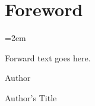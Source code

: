 \pagestyle{myheadings}
\thispagestyle{plain}
\section*{\Large\bfseries Foreword}
\bigskip
\parindent=2em

\noindent
Forward text goes here.

\bigskip

\noindent
Author

\noindent Author's Title


